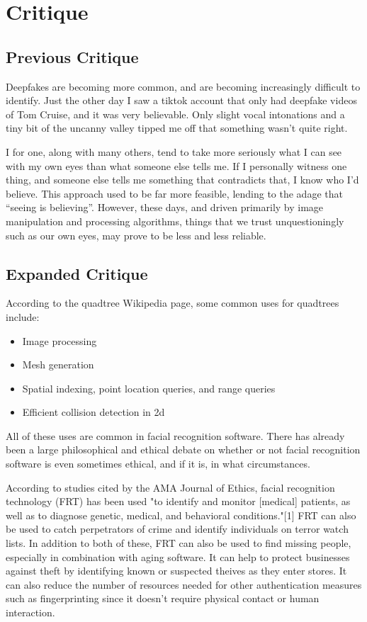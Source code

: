 \documentclass{article}
\begin{document}
\section{Critique}
\subsection{Previous Critique}
Deepfakes are becoming more common, and are becoming increasingly difficult to identify. Just the other day I saw a tiktok account that only had deepfake videos of Tom Cruise, and it was very believable. Only slight vocal intonations and a tiny bit of the uncanny valley tipped me off that something wasn’t quite right.

I for one, along with many others, tend to take more seriously what I can see with my own eyes than what someone else tells me. If I personally witness one thing, and someone else tells me something that contradicts that, I know who I’d believe. This approach used to be far more feasible, lending to the adage that “seeing is believing”. However, these days, and driven primarily by image manipulation and processing algorithms, things that we trust unquestioningly such as our own eyes, may prove to be less and less reliable.

\subsection{Expanded Critique}
According to the quadtree Wikipedia page, some common uses for quadtrees include:
\begin{itemize}
  \item Image processing
  \item Mesh generation
  \item Spatial indexing, point location queries, and range queries
  \item Efficient collision detection in 2d
\end{itemize}

All of these uses are common in facial recognition software. There has already been a large philosophical and ethical debate
on whether or not facial recognition software is even sometimes ethical, and if it is, in what circumstances.

According to studies cited by the AMA Journal of Ethics, facial recognition technology (FRT) has been used "to identify and
monitor [medical] patients, as well as to diagnose genetic, medical, and behavioral conditions."[1] FRT can also be used to
catch perpetrators of crime and identify individuals on terror watch lists. In addition to both of these, FRT can also
be used to find missing people, especially in combination with aging software. It can help to protect businesses against
theft by identifying known or suspected theives as they enter stores. It can also reduce the number of resources needed
for other authentication measures such as fingerprinting since it doesn't require physical contact or human interaction.
\end{document}
